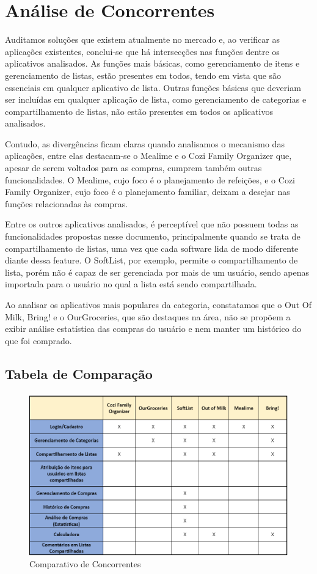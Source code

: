 \chapter{Análise de Concorrentes}

Auditamos soluções que existem atualmente no mercado e, ao verificar as aplicações existentes, conclui-se que há intersecções nas funções dentre os aplicativos analisados. As funções mais básicas, como gerenciamento de itens e gerenciamento de listas, estão presentes em todos, tendo em vista que são essenciais em qualquer aplicativo de lista. Outras funções básicas que deveriam ser incluídas em qualquer aplicação de lista, como gerenciamento de categorias e compartilhamento de listas, não estão presentes em todos os aplicativos analisados.

Contudo, as divergências ficam claras quando analisamos o mecanismo das aplicações, entre elas destacam-se o Mealime e o Cozi Family Organizer que, apesar de serem voltados para as compras, cumprem também outras funcionalidades. O Mealime, cujo foco é o planejamento de refeições, e o Cozi Family Organizer, cujo foco é o planejamento familiar, deixam a desejar nas funções relacionadas às compras.

Entre os outros aplicativos analisados, é perceptível que não possuem todas as funcionalidades propostas nesse documento, principalmente quando se trata de compartilhamento de listas, uma vez que cada software lida de modo diferente diante dessa feature. O SoftList, por exemplo, permite o compartilhamento de lista, porém não é capaz de ser gerenciada por mais de um usuário, sendo apenas importada para o usuário no qual a lista está sendo compartilhada.

Ao analisar os aplicativos mais populares da categoria, constatamos que o Out Of Milk, Bring! e o OurGroceries, que são destaques na área, não se propõem a exibir análise estatística das compras do usuário e nem manter um histórico do que foi comprado.

\pagebreak

\section{Tabela de Comparação}

	\begin{figure}[h!]
	\centering
	\includegraphics[width=.8\textwidth,height=\textheight,keepaspectratio]{./imagens/tabela_comparativa.png} 
	\caption{Comparativo de Concorrentes}
	\end{figure}
	